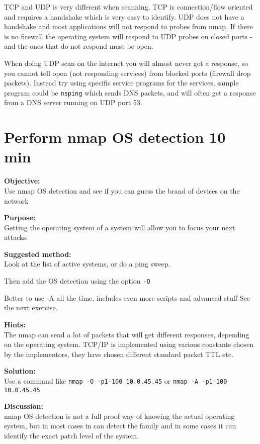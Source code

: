 \documentclass[a4paper,11pt,notitlepage]{report}
\begin{document}
TCP and UDP is very different when scanning. TCP is connection/flow oriented and requires a handshake which is very easy to identify. UDP does not have a handshake and most applications will not respond to probes from nmap. If there is no firewall the operating system will respond to UDP probes on closed ports - and the ones that do not respond must be open.

When doing UDP scan on the internet you will almost never get a response, so you cannot tell open (not responding services) from blocked ports (firewall drop packets). Instead try using specific service programs for the services, sample program could be \verb+nsping+ which sends DNS packets, and will often get a response from a DNS server running on UDP port 53.

\chapter{Perform nmap OS detection 10 min}
\label{ex:nmap-os}

{\bf Objective:} \\
Use nmap OS detection and see if you can guess the brand of devices on the network

{\bf Purpose:}\\
Getting the operating system of a system will allow you to focus your next attacks.

{\bf Suggested method:}\\
Look at the list of active systems, or do a ping sweep.

Then add the OS detection using the option \verb+-O+

Better to use -A all the time, includes even more scripts and advanced stuff
See the next exercise.

{\bf Hints:} \\
The nmap can send a lot of packets that will get different responses, depending on the operating system. TCP/IP is implemented using various constants chosen by the implementors, they have chosen different standard packet TTL etc.

{\bf Solution:}\\
Use a command like \verb+nmap -O -p1-100 10.0.45.45+ or  \verb+nmap -A -p1-100 10.0.45.45+


{\bf Discussion:}\\
nmap OS detection is not a full proof way of knowing the actual operating system, but in most cases in can detect the family and in some cases it can identify the exact patch level of the system.
\end{document}

